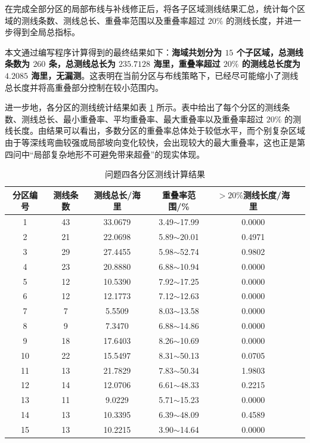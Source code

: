 \documentclass[UTF-8,a4paper,zihao=-4]{ctexart}
\begin{document}
在完成全部分区的局部布线与补线修正后，将各子区域测线结果汇总，统计每个区域的测线条数、测线总长、重叠率范围以及重叠率超过 $20\%$ 的测线长度，并进一步得到全局总指标。

本文通过编写程序计算得到的最终结果如下：\textbf{海域共划分为 $15$ 个子区域，总测线条数为 $260$ 条，总测线总长为 $235.7128$ 海里，重叠率超过 $20\%$ 的测线总长度为 $4.2085$ 海里，无漏测}。这表明在当前分区与布线策略下，已经尽可能缩小了测线总长度并将高重叠部分控制在较小范围内。

进一步地，各分区的测线统计结果如表 \ref{tab:q4_regions} 所示。表中给出了每个分区的测线条数、测线总长、最小重叠率、平均重叠率、最大重叠率以及重叠率超过 $20\%$ 的测线长度。由结果可以看出，多数分区的重叠率总体处于较低水平，而个别复杂区域由于等深线弯曲较强或局部坡向变化较快，会出现较大的最大重叠率，这也正是第四问中“局部复杂地形不可避免带来超叠”的现实体现。

\begin{table}[htbp]
\centering
\small
\caption{问题四各分区测线计算结果}
\label{tab:q4_regions}
\begin{tabular}{|c|c|c|c|c|c|}
\hline
分区编号 & 测线条数 & 测线总长/海里 & 重叠率范围/\% & $>20\%$测线长度/海里 \\ \hline
1  & 43 & 33.0679 & 3.49$\sim$17.99 & 0.0000 \\ \hline
2  & 21 & 22.0698 & 5.89$\sim$20.01 & 0.4971 \\ \hline
3  & 29 & 27.4455 & 5.98$\sim$52.74 & 0.9802  \\ \hline
4  & 23 & 20.8880 & 6.88$\sim$10.94 & 0.0000  \\ \hline
5  & 12 & 10.5390 & 7.92$\sim$17.25 & 0.0000  \\ \hline
6  & 12 & 12.1773 & 7.12$\sim$12.63 & 0.0000  \\ \hline
7  & 7  & 5.5509  & 8.03$\sim$13.58 & 0.0000  \\ \hline
8  & 9  & 7.3470  & 6.88$\sim$14.86 & 0.0000  \\ \hline
9  & 18 & 17.6403 & 8.26$\sim$10.69 & 0.0000  \\ \hline
10 & 22 & 15.5497 & 8.31$\sim$50.13 & 0.0705  \\ \hline
11 & 13 & 21.7829 & 7.83$\sim$50.34 & 1.9803  \\ \hline
12 & 14 & 12.0706 & 6.61$\sim$48.33 & 0.2215 \\ \hline
13 & 11 & 9.0229  & 5.71$\sim$15.23 & 0.0000  \\ \hline
14 & 13 & 10.3395 & 6.39$\sim$48.09 & 0.4589  \\ \hline
15 & 13 & 10.2215 & 3.90$\sim$14.64 & 0.0000  \\ \hline
\end{tabular}
\end{table}
\end{document}
